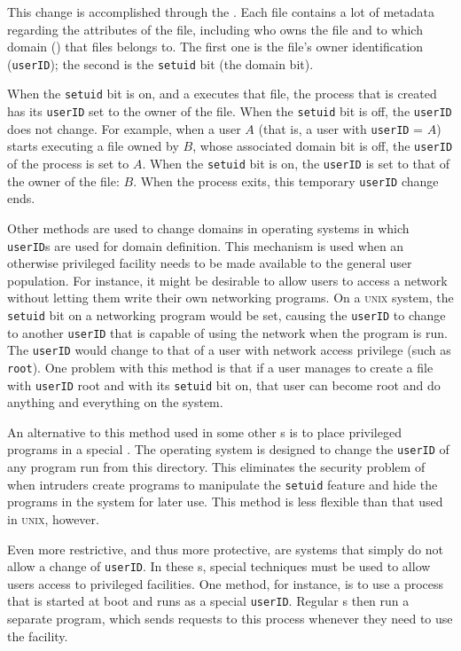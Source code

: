 This change is accomplished through the .
Each file contains a lot of metadata regarding the attributes of the file, including who owns the file and to which domain () that files belongs to.
The first one is the file's owner identification (\texttt{userID}); the second is the \texttt{setuid} bit (the domain bit).

When the \texttt{setuid} bit is on, and a  executes that file, the process that is created has its \texttt{userID} set to the owner of the file.
When the \texttt{setuid} bit is off, the \texttt{userID} does not change.
For example, when a user $A$ (that is, a user with \texttt{userID} = $A$) starts executing a file owned by $B$, whose associated domain bit is off, the \texttt{userID} of the process is set to $A$.
When the \texttt{setuid} bit is on, the \texttt{userID} is set to that of the owner of the file: $B$.
When the process exits, this temporary \texttt{userID} change ends.

Other methods are used to change domains in operating systems in which \texttt{userID}s are used for domain definition.
This mechanism is used when an otherwise privileged facility needs to be made available to the general user population.
For instance, it might be desirable to allow users to access a network without letting them write their own networking programs.
On a \textsc{unix} system, the \texttt{setuid} bit on a networking program would be set, causing the \texttt{userID} to change to another \texttt{userID} that is capable of using the network when the program is run.
The \texttt{userID} would change to that of a user with network access privilege (such as \texttt{root}).
One problem with this method is that if a user manages to create a file with \texttt{userID} root and with its \texttt{setuid} bit on, that user can become root and do anything and everything on the system.

An alternative to this method used in some other s is to place privileged programs in a special .
The operating system is designed to change the \texttt{userID} of any program run from this directory.
This eliminates the security problem of when intruders create programs to manipulate the \texttt{setuid} feature and hide the programs in the system for later use.
This method is less flexible than that used in \textsc{unix}, however.

Even more restrictive, and thus more protective, are systems that simply do not allow a change of \texttt{userID}.
In these s, special techniques must be used to allow users access to privileged facilities.
One method, for instance, is to use a  process that is started at boot and runs as a special \texttt{userID}.
Regular s then run a separate program, which sends requests to this process whenever they need to use the facility.

